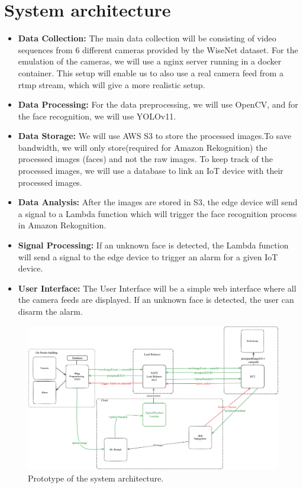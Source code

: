 \documentclass[conference]{IEEEtran}
\begin{document}
\section{System architecture}
\begin{itemize}
    \item \textbf{Data Collection:} The main data collection will be consisting of video sequences from 6 different cameras provided by the WiseNet dataset.
          For the emulation of the cameras, we will use a nginx server running in a docker container. This setup will
          enable us to also use a real camera feed from a rtmp stream, which will give a more realistic setup.
    \item \textbf{Data Processing:} For the data preprocessing, we will use OpenCV, and for the face recognition, we will use YOLOv11.
    \item \textbf{Data Storage:} We will use AWS S3 to store the processed images.To save bandwidth, we will only store(required for Amazon Rekognition) the processed images (faces)
          and not the raw images. To keep track of the processed images, we will use a database to link an IoT device with their processed images.
    \item \textbf{Data Analysis:} After the images are stored in S3, the edge device will send a signal to a Lambda function which will trigger the face recognition
          process in Amazon Rekognition.
    \item \textbf{Signal Processing:} If an unknown face is detected, the Lambda function will send a signal to the edge device to trigger an alarm for a given IoT device.
    \item \textbf{User Interface:} The User Interface will be a simple web interface where all the camera feeds are displayed. If an unknown face is detected, the user can disarm the alarm.

\end{itemize}

\begin{figure}[h!]
    \centering
    \includegraphics[width=1\linewidth]{images/architecturev2.excalidraw.png}
    \caption{Prototype of the system architecture.}
    \label{fig:enter-label}
\end{figure}
\end{document}
